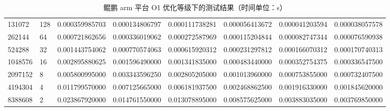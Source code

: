 \documentclass[a4paper]{article}
\begin{document}
\begin{table}[]
{\begin{tabular}{llllllll}
      131072  & 128     & 0.000359985703 & 0.000134806797  & 0.000111738281 & 0.000056413672 & 0.000041203594 & 0.000038057578 \\
      262144  & 64      & 0.000721862656 & 0.000336019062  & 0.000272587969 & 0.000115204844 & 0.000082747344 & 0.000076590938 \\
      524288  & 32      & 0.001443754062 & 0.000770574063  & 0.000615920312 & 0.000231297812 & 0.000166070312 & 0.000170740313 \\
      1048576 & 16      & 0.002895880625 & 0.001596490000  & 0.001341835000 & 0.000483440000 & 0.000352754375 & 0.000336547500 \\
      2097152 & 8       & 0.005800995000 & 0.003343596250  & 0.002805205000 & 0.001013960000 & 0.000753855000 & 0.000732407500 \\
      4194304 & 4       & 0.011799570000 & 0.007125665000  & 0.006181937500 & 0.002468862500 & 0.001916330000 & 0.001845620000 \\
      8388608 & 2       & 0.023867920000 & 0.014761550000  & 0.013078895000 & 0.008575625000 & 0.003883035000 & 0.003769850000
    \end{tabular}%
  }
  \caption{鲲鹏 arm 平台 O1 优化等级下的测试结果（时间单位：s）}
  \label{tab:arm-O1-test}
\end{table}
\end{document}
